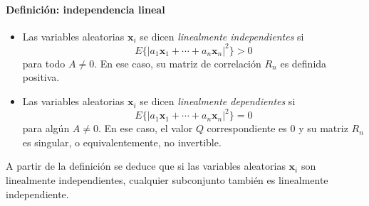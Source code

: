 \documentclass[a4paper]{report}
\newcommand{\x}{\mathbf{x}}
\begin{document}
\paragraph{Definición: independencia lineal}
\begin{itemize}
 \item Las variables aleatorias \(\x_i\) se dicen \emph{linealmente independientes} si
\[
 E\{|a_1\x_1+\cdots+a_n\x_n|^2\}>0
\]
para todo \(A\neq0\). En ese caso, su matriz de correlación \(R_n\) es definida positiva.
 \item Las variables aleatorias \(\x_i\) se dicen \emph{linealmente dependientes} si
\[
 E\{|a_1\x_1+\cdots+a_n\x_n|^2\}=0
\]
para algún \(A\neq0\). En ese caso, el valor \(Q\) correspondiente es 0 y su matriz \(R_n\) es singular, o equivalentemente, no invertible.
\end{itemize}
A partir de la definición se deduce que si las variables aleatorias \(\x_i\) son linealmente independientes, cualquier subconjunto también es linealmente independiente.
\end{document}

